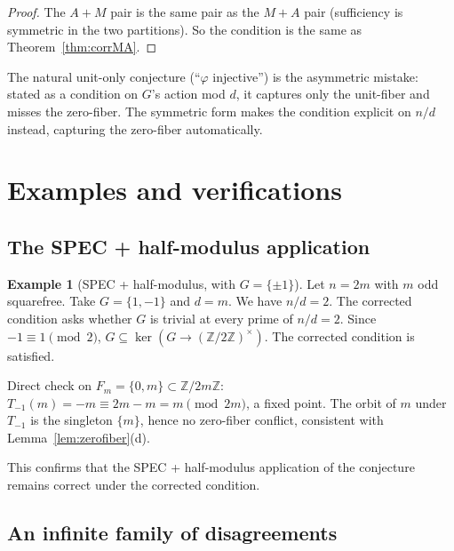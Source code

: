 \documentclass[11pt,reqno]{amsart}
\theoremstyle{plain}
\theoremstyle{definition}
\newtheorem{example}[theorem]{Example}
\newcommand{\Z}{\mathbb{Z}}
\begin{document}
\begin{proof}
The $A{+}M$ pair is the same pair as the $M{+}A$ pair (sufficiency is symmetric in the two partitions). So the condition is the same as Theorem~\ref{thm:corrMA}.
\end{proof}

The natural unit-only conjecture (``$\varphi$ injective'') is the asymmetric mistake: stated as a condition on $G$'s action mod $d$, it captures only the unit-fiber and misses the zero-fiber. The symmetric form makes the condition explicit on $n/d$ instead, capturing the zero-fiber automatically.

\section{Examples and verifications}

\subsection{The SPEC + half-modulus application}

\begin{example}[SPEC + half-modulus, with $G = \{\pm 1\}$] \label{ex:SPEC}
Let $n = 2m$ with $m$ odd squarefree. Take $G = \{1, -1\}$ and $d = m$. We have $n/d = 2$. The corrected condition asks whether $G$ is trivial at every prime of $n/d = 2$. Since $-1 \equiv 1 \pmod 2$, $G \subseteq \ker(G \to (\Z/2\Z)^{\times})$. The corrected condition is satisfied.

Direct check on $F_m = \{0, m\} \subset \Z/2m\Z$: $T_{-1}(m) = -m \equiv 2m - m = m \pmod{2m}$, a fixed point. The orbit of $m$ under $T_{-1}$ is the singleton $\{m\}$, hence no zero-fiber conflict, consistent with Lemma~\ref{lem:zerofiber}(d).
\end{example}

This confirms that the SPEC + half-modulus application of the conjecture remains correct under the corrected condition.

\subsection{An infinite family of disagreements}
\end{document}
